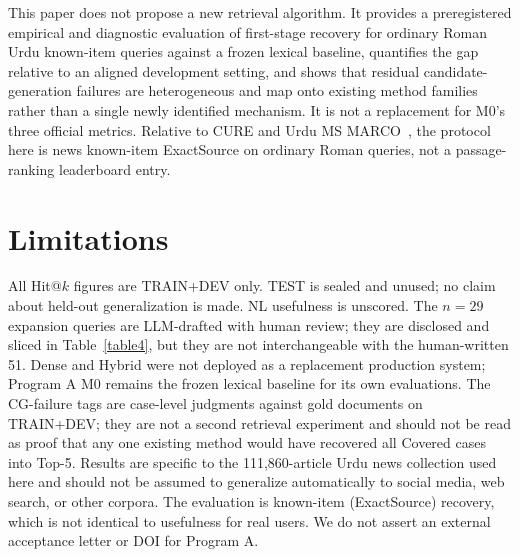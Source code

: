 \documentclass[10pt,letterpaper]{article}
\begin{document}
This paper does not propose a new retrieval algorithm. It provides a preregistered empirical and diagnostic evaluation of first-stage recovery for ordinary Roman Urdu known-item queries against a frozen lexical baseline, quantifies the gap relative to an aligned development setting, and shows that residual candidate-generation failures are heterogeneous and map onto existing method families rather than a single newly identified mechanism. It is not a replacement for M0's three official metrics. Relative to CURE and Urdu MS MARCO~\cite{bib5,bib6}, the protocol here is news known-item ExactSource on ordinary Roman queries, not a passage-ranking leaderboard entry.

\section*{Limitations}
All Hit@$k$ figures are TRAIN+DEV only. TEST is sealed and unused; no claim about held-out generalization is made. NL usefulness is unscored. The $n = 29$ expansion queries are LLM-drafted with human review; they are disclosed and sliced in Table~\ref{table4}, but they are not interchangeable with the human-written 51. Dense and Hybrid were not deployed as a replacement production system; Program A M0 remains the frozen lexical baseline for its own evaluations. The CG-failure tags are case-level judgments against gold documents on TRAIN+DEV; they are not a second retrieval experiment and should not be read as proof that any one existing method would have recovered all Covered cases into Top-5. Results are specific to the 111,860-article Urdu news collection used here and should not be assumed to generalize automatically to social media, web search, or other corpora. The evaluation is known-item (ExactSource) recovery, which is not identical to usefulness for real users. We do not assert an external acceptance letter or DOI for Program A.
\end{document}
